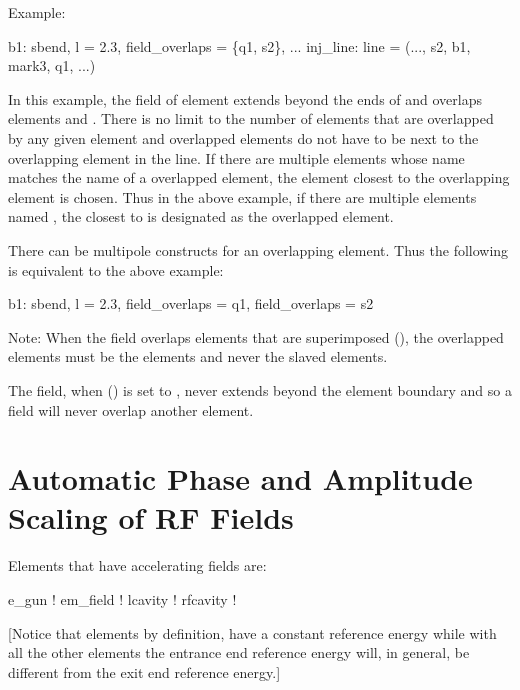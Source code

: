 Example:
\begin{example}
  b1: sbend, l = 2.3, field_overlaps = \{q1, s2\}, ...
  inj_line: line = (..., s2, b1, mark3, q1, ...)
\end{example}
In this example, the field of element  extends beyond the ends of  and overlaps
elements  and . There is no limit to the number of elements that are overlapped by any
given element and overlapped elements do not have to be next to the overlapping element in the
line. If there are multiple elements whose name matches the name of a overlapped element, the
element closest to the overlapping element is chosen. Thus in the above example, if there are
multiple elements named , the closest  to  is designated as the overlapped
element.

There can be multipole  constructs for an overlapping element.
Thus the following is equivalent to the above example:
\begin{example}
  b1: sbend, l = 2.3, field_overlaps = q1, field_overlaps = s2
\end{example}

Note: When the field overlaps elements that are superimposed (), the overlapped 
elements must be the  elements and never the slaved elements.

The field, when  () is set to , never extends beyond
the element boundary and so a  field will never overlap another element.

\section{Automatic Phase and Amplitude Scaling of RF Fields}
\label{s:autoscale}

Elements that have accelerating fields are:
\begin{example}
  e_gun       ! 
  em_field    ! 
  lcavity     ! 
  rfcavity    ! 
\end{example}
[Notice that  elements by definition, have a constant reference energy while with all
the other elements the entrance end reference energy will, in general, be different from the exit
end reference energy.]

